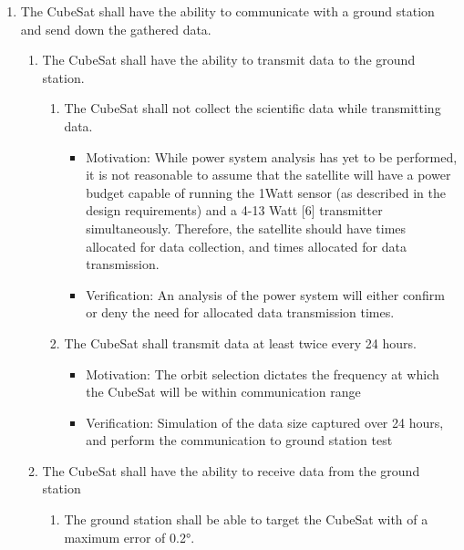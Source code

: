 \begin{enumerate}
\begin{enumerate}
\begin{enumerate}
\begin{itemize}
                \end{itemize}
        \end{enumerate}
    \end{enumerate} %
    \item The CubeSat shall have the ability to communicate with a ground station and send down the gathered data.
    \begin{enumerate}
        \item The CubeSat shall have the ability to transmit data to the ground station.
        \begin{enumerate}
            \item The CubeSat shall not collect the scientific data while transmitting data.
                \begin{itemize}
                    \item Motivation: While power system analysis has yet to be performed, it is not reasonable to assume that the satellite will have a power budget capable of running the 1Watt sensor (as described in the design requirements) and a 4-13 Watt [6] transmitter simultaneously. Therefore, the satellite should have times allocated for data collection, and times allocated for data transmission. 
                    \item Verification: An analysis of the power system will either confirm or deny the need for allocated data transmission times. 
                \end{itemize}
            \item The CubeSat shall transmit data at least twice every 24 hours. 
                \begin{itemize}
                    \item Motivation: The orbit selection dictates the frequency at which the CubeSat will be within communication range 
                    \item Verification: Simulation of the data size captured over 24 hours, and perform the communication to ground station test
                \end{itemize}
        \end{enumerate}
    \item The CubeSat shall have the ability to receive data from the ground station 
        \begin{enumerate}
            \item The ground station shall be able to target the CubeSat with of a maximum error of 0.2°.
                \begin{itemize}

\end{itemize}
\end{enumerate}
\end{enumerate}
\end{enumerate}
